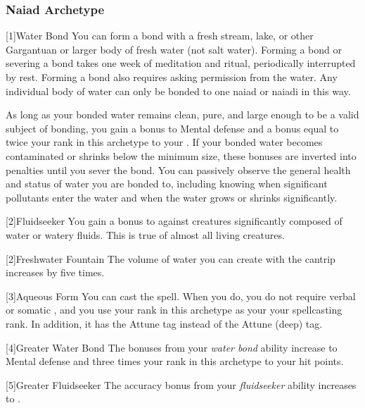         \subsubsection{Naiad Archetype}

            [1]{Water Bond} You can form a bond with a fresh stream, lake, or other Gargantuan or larger body of fresh water (not salt water).
            Forming a bond or severing a bond takes one week of meditation and ritual, periodically interrupted by rest.
            Forming a bond also requires asking permission from the water.
            Any individual body of water can only be bonded to one naiad or naiadi in this way.

            As long as your bonded water remains clean, pure, and large enough to be a valid subject of bonding, you gain a  bonus to Mental defense and a bonus equal to twice your rank in this archetype to your .
            If your bonded water becomes contaminated or shrinks below the minimum size, these bonuses are inverted into penalties until you sever the bond.
            You can passively observe the general health and status of water you are bonded to, including knowing when significant pollutants enter the water and when the water grows or shrinks significantly.

            [2]{Fluidseeker} You gain a  bonus to  against creatures significantly composed of water or watery fluids.
            This is true of almost all living creatures.

            [2]{Freshwater Fountain} The volume of water you can create with the  cantrip increases by five times.

            [3]{Aqueous Form} You can cast the  spell.
            When you do, you do not require verbal or somatic , and you use your rank in this archetype as your your spellcasting rank.
            In addition, it has the Attune tag instead of the Attune (deep) tag.

            [4]{Greater Water Bond} The bonuses from your \textit{water bond} ability increase to  Mental defense and three times your rank in this archetype to your hit points.

            [5]{Greater Fluidseeker} The accuracy bonus from your \textit{fluidseeker} ability increases to .

